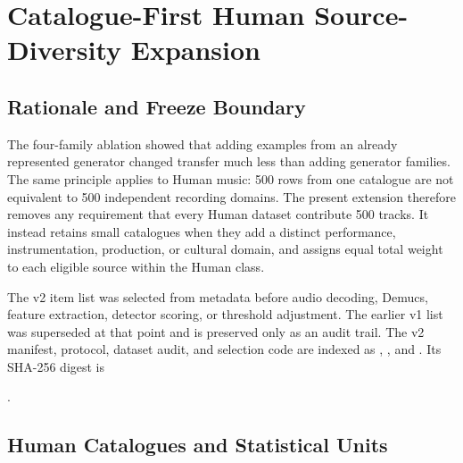 \section{Catalogue-First Human Source-Diversity Expansion}
\label{sec:human-source-diversity}

\subsection{Rationale and Freeze Boundary}

The four-family ablation showed that adding examples from an already represented
generator changed transfer much less than adding generator families.  The same
principle applies to Human music: 500 rows from one catalogue are not equivalent to
500 independent recording domains.  The present extension therefore removes any
requirement that every Human dataset contribute 500 tracks.  It instead retains
small catalogues when they add a distinct performance, instrumentation, production,
or cultural domain, and assigns equal total weight to each eligible source within
the Human class.

The v2 item list was selected from metadata before audio decoding, Demucs, feature
extraction, detector scoring, or threshold adjustment.  The earlier v1 list was
superseded at that point and is preserved only as an audit trail.  The v2 manifest,
protocol, dataset audit, and selection code are indexed as ,
, and .  Its SHA-256 digest is

\begin{center}
\small{}.
\end{center}

\subsection{Human Catalogues and Statistical Units}

